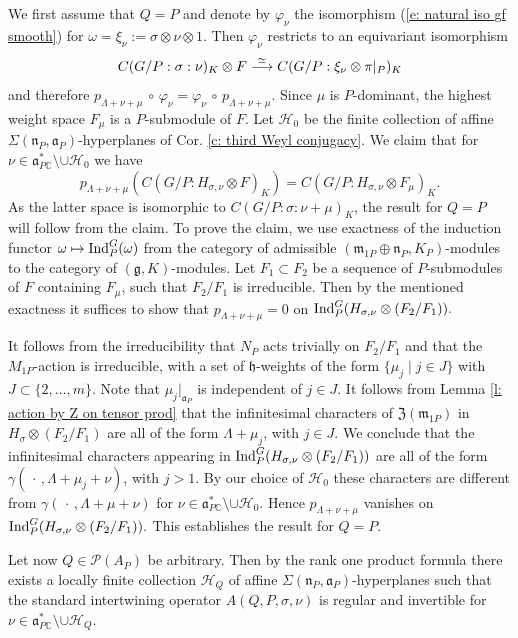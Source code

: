\documentclass[12pt,a4paper]{article}
\def\proof{\par\noindent{\it Proof.}{\ }{\ }}
\def\msy#1{{\mathbb #1}}
\def\C{{\msy C}}
\def\gf{\varphi}
\def\gg{\gamma}
\def\gs{\sigma}
\def\gS{\Sigma}
\def\got#1{\mathfrak #1}
\def\fa{{\got a}}
\def\fg{{\got g}}
\def\fh{{\got h}}
\def\fm{{\got m}}
\def\fn{{\got n}}
\def\after{\,{\scriptstyle\circ}\,}
\def\iC{{\scriptscriptstyle \C}}
\def\cH{{\mathcal H}}
\def\cP{{\mathcal P}}
\numberwithin{Thm}{section}
\numberwithin{equation}{section}
\def\Ind{{\rm Ind}}
\def\dotvar{\, \cdot\,}
\def\fZ{{\mathfrak Z}}
\def\faPdc{{\fa_{P\iC}^*}}
\def\gL{\Lambda}
\numberwithin{equation}{section}
\def\fZ{{\mathfrak Z}}
\def\gL{\Lambda}
\def\faPdc{\fa_{P\iC}^*}
\def\fh{{\mathfrak h}}
\def\faP{\fa_P}
\def\bfhyp{hyperplanes}
\begin{document}
\proof 
We first assume that $Q = P$ and denote by $\gf_\nu$ the isomorphism
(\ref{e: natural iso gf smooth}) for $\omega = \xi_\nu:= \gs \otimes \nu \otimes 1.$  Then 
$\gf_\nu$ restricts to an equivariant isomorphism
$$ 
C(G/P: \gs: \nu)_K \otimes F \;{\buildrel\simeq \over\longrightarrow} \; C(G/P: \xi_\nu \otimes \pi|_P)_K
$$ 
and therefore $p_{\gL + \nu + \mu} \after \gf_\nu = \gf_\nu \after p_{\gL + \nu +\mu}.$ 
Since $\mu$ is $P$-dominant,  the highest weight space $F_\mu$ is a $P$-submodule 
of $F.$ Let $\cH_0$ be the finite collection of affine $\gS(\fn_P, \fa_P)$-{\bfhyp} of Cor. \ref{c: third Weyl conjugacy}. We claim that
for $\nu \in \faPdc\setminus \cup \cH_0$ we have
$$ 
p_{\gL + \nu +\mu}(C(G/P: H_{\gs, \nu} \otimes F)_K) = C(G/P: H_{\gs ,\nu} \otimes F_\mu)_K.
$$ 
As the latter space is isomorphic to $C(G/P : \gs : \nu + \mu)_K$, the result for $Q = P$ will follow from the claim.
To prove the claim, we use exactness of the induction functor $\omega \mapsto \Ind_P^G(\omega)$ 
from the category of admissible $(\fm_{1P}\oplus \fn_P, K_P)$-modules 
to the category of $(\fg, K)$-modules. 
Let $F_1 \subset F_2$ be a sequence
of $P$-submodules of $F$ containing $F_\mu$, 
such that $F_2/F_1$ is irreducible. Then by the mentioned exactness it suffices
to show that $p_{\gL + \nu +\mu} = 0$ on $\Ind_P^G(H_{\gs, \nu} \otimes (F_2/F_1)).$

It follows from the irreducibility that $N_P$ acts trivially on $F_2/F_1$ and that 
the $M_{1P}$-action is irreducible, with a set of $\fh$-weights of the form $\{\mu_j \mid j \in J\}$ 
with $J \subset \{2, \ldots, m\}.$ Note that $\mu_j|_{\fa_P}$ is independent of $j \in J.$ 
 It follows from Lemma \ref{l: action by Z on tensor prod} that the infinitesimal characters of $\fZ(\fm_{1P})$ in $H_\gs \otimes (F_2/F_1)$ 
are all of the form $\gL + \mu_j$, with $j \in J.$
We conclude that the infinitesimal characters appearing in 
$\Ind_P^G(H_{\gs,\nu} \otimes (F_2/F_1))$ are all of the form $\gg(\dotvar, \gL + \mu_j + \nu)$, 
with $j > 1.$ By our choice of $\cH_0$ these characters are different
from $\gg(\dotvar, \gL +\mu + \nu)$ for $\nu \in \faPdc\setminus \cup \cH_0.$ 
Hence $p_{\gL + \nu +\mu} $ vanishes on $\Ind_P^G(H_{\gs, \nu} \otimes (F_2/F_1)).$ 
This establishes the result for $Q = P.$ 

Let now $Q \in \cP(A_P)$ be arbitrary. Then by the rank one product formula  
there exists a locally finite collection
$\cH_Q$ of affine $\gS(\fn_P, \faP)$-{\bfhyp} such that the standard intertwining operator $A(Q,P,\gs,\nu)$ 
is regular and invertible for $\nu \in \faPdc\setminus\cup \cH_Q.$ 
\end{document}
